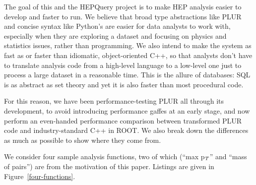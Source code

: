 \documentclass[10pt, conference, compsocconf]{IEEEtran}
\begin{document}
The goal of this and the HEPQuery project is to make HEP analysis easier to develop and faster to run. We believe that broad type abstractions like PLUR and concise syntax like Python's are easier for data analysts to work with, especially when they are exploring a dataset and focusing on physics and statistics issues, rather than programming. We also intend to make the system as fast as or faster than idiomatic, object-oriented C++, so that analysts don't have to translate analysis code from a high-level language to a low-level one just to process a large dataset in a reasonable time. This is the allure of databases: SQL is as abstract as set theory and yet it is also faster than most procedural code.

For this reason, we have been performance-testing PLUR all through its development, to avoid introducing performance gaffes at an early stage, and now perform an even-handed performance comparison between transformed PLUR code and industry-standard C++ in ROOT. We also break down the differences as much as possible to show where they come from.

We consider four sample analysis functions, two of which (``max p$_{\mbox{\scriptsize T}}$'' and ``mass of pairs'') are from the motivation of this paper. Listings are given in Figure~\ref{four-functions}.
\end{document}
